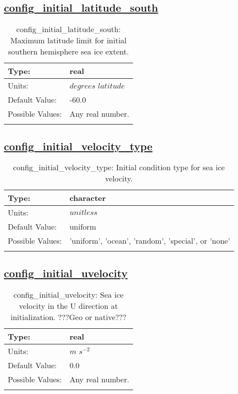 \subsection[config\_initial\_latitude\_south]{\hyperref[sec:nm_tab_initialize]{config\_initial\_latitude\_south}}
\label{subsec:nm_sec_config_initial_latitude_south}
\begin{center}
\begin{longtable}{| p{2.0in} || p{4.0in} |}
    \hline
    Type: & real \\
    \hline
    Units: & $degrees$ $latitude$ \\
    \hline
    Default Value: & -60.0 \\
    \hline
    Possible Values: & Any real number. \\
    \hline
    \caption{config\_initial\_latitude\_south: Maximum latitude limit for initial southern hemisphere sea ice extent.}
\end{longtable}
\end{center}
\subsection[config\_initial\_velocity\_type]{\hyperref[sec:nm_tab_initialize]{config\_initial\_velocity\_type}}
\label{subsec:nm_sec_config_initial_velocity_type}
\begin{center}
\begin{longtable}{| p{2.0in} || p{4.0in} |}
    \hline
    Type: & character \\
    \hline
    Units: & $unitless$ \\
    \hline
    Default Value: & uniform \\
    \hline
    Possible Values: & 'uniform', 'ocean', 'random', 'special', or 'none' \\
    \hline
    \caption{config\_initial\_velocity\_type: Initial condition type for sea ice velocity.}
\end{longtable}
\end{center}
\subsection[config\_initial\_uvelocity]{\hyperref[sec:nm_tab_initialize]{config\_initial\_uvelocity}}
\label{subsec:nm_sec_config_initial_uvelocity}
\begin{center}
\begin{longtable}{| p{2.0in} || p{4.0in} |}
    \hline
    Type: & real \\
    \hline
    Units: & $m$ $s^{-2}$ \\
    \hline
    Default Value: & 0.0 \\
    \hline
    Possible Values: & Any real number. \\
    \hline
    \caption{config\_initial\_uvelocity: Sea ice velocity in the U direction at initialization. ???Geo or native???}
\end{longtable}
\end{center}
